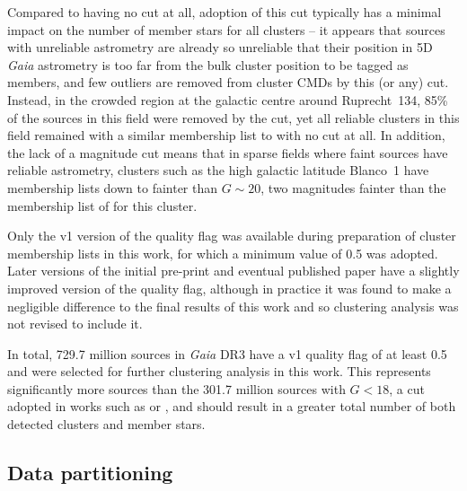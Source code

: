 Compared to having no cut at all, adoption of this cut typically has a minimal impact on the number of member stars for all clusters -- it appears that sources with unreliable astrometry are already so unreliable that their position in 5D \emph{Gaia} astrometry is too far from the bulk cluster position to be tagged as members, and few outliers are removed from cluster CMDs by this (or any) cut. Instead, in the crowded region at the galactic centre around Ruprecht~134, 85\% of the sources in this field were removed by the cut, yet all reliable clusters in this field \citep[including the nearby UFMG~88 reported by][]{ferreira_new_2021} remained with a similar membership list to with no cut at all. In addition, the lack of a magnitude cut means that in sparse fields where faint sources have reliable astrometry, clusters such as the high galactic latitude Blanco~1 have membership lists down to fainter than $G\sim20$, two magnitudes fainter than the membership list of \cite{cantat-gaudin_clusters_2020} for this cluster. 

Only the v1 version of the \cite{rybizki_classifier_2022} quality flag was available during preparation of cluster membership lists in this work, for which a minimum value of 0.5 was adopted. Later versions of the initial \cite{rybizki_classifier_2022} pre-print and eventual published paper have a slightly improved version of the quality flag, although in practice it was found to make a negligible difference to the final results of this work and so clustering analysis was not revised to include it.

In total, 729.7 million sources in \emph{Gaia} DR3 have a \cite{rybizki_classifier_2022} v1 quality flag of at least 0.5 and were selected for further clustering analysis in this work. This represents significantly more sources than the 301.7 million sources with $G<18$, a cut adopted in works such as \cite{castro-ginard_hunting_2022} or \cite{cantat-gaudin_clusters_2020}, and should result in a greater total number of both detected clusters and member stars.



\subsection{Data partitioning}


